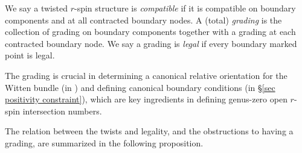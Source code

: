 \documentclass[11pt]{amsart}
\theoremstyle{definition}
\theoremstyle{remark}
\newcommand{\<}{\left<}
\renewcommand{\>}{\right>}
\numberwithin{equation}{section}
\begin{document}
We say a twisted $r$-spin structure is \textit{compatible} if it is compatible on boundary components and at all contracted boundary nodes.  A (total) \textit{grading} is the collection of grading on boundary components together with a grading at each contracted boundary node. We say a grading is \textit{legal} if every boundary marked point is legal.


The grading is crucial in determining a canonical relative orientation for the Witten bundle (in \cite{TZ1}) and defining canonical boundary conditions (in \S \ref{sec positivity constraint}), which are key ingredients in defining genus-zero open $r$-spin intersection numbers.




The relation between the twists %
and legality, and %
the obstructions to having %
a grading, are %
summarized in the following %
proposition.
\end{document}
